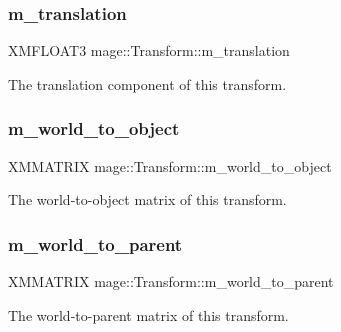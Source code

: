 \subsubsection{\texorpdfstring{m\+\_\+translation}{m\_translation}}
{\footnotesize\ttfamily X\+M\+F\+L\+O\+A\+T3 mage\+::\+Transform\+::m\+\_\+translation\hspace{0.3cm}{\ttfamily [private]}}

The translation component of this transform. \hypertarget{structmage_1_1_transform_a873fefd93a3c1ca938e2bbecdbc5b3ac}{}\label{structmage_1_1_transform_a873fefd93a3c1ca938e2bbecdbc5b3ac} 
\subsubsection{\texorpdfstring{m\+\_\+world\+\_\+to\+\_\+object}{m\_world\_to\_object}}
{\footnotesize\ttfamily X\+M\+M\+A\+T\+R\+IX mage\+::\+Transform\+::m\+\_\+world\+\_\+to\+\_\+object\hspace{0.3cm}{\ttfamily [private]}}

The world-\/to-\/object matrix of this transform. \hypertarget{structmage_1_1_transform_a1a98dc6d2852ad1a884327ad3581eb52}{}\label{structmage_1_1_transform_a1a98dc6d2852ad1a884327ad3581eb52} 
\subsubsection{\texorpdfstring{m\+\_\+world\+\_\+to\+\_\+parent}{m\_world\_to\_parent}}
{\footnotesize\ttfamily X\+M\+M\+A\+T\+R\+IX mage\+::\+Transform\+::m\+\_\+world\+\_\+to\+\_\+parent\hspace{0.3cm}{\ttfamily [private]}}

The world-\/to-\/parent matrix of this transform. 